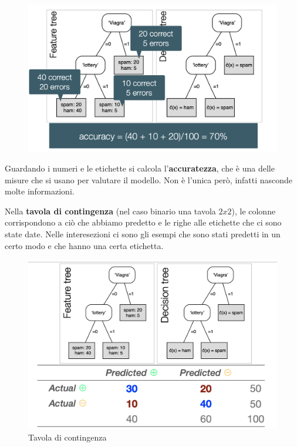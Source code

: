 \begin{figure}[!h]
    \centering
    \includegraphics[scale=0.6]{images/featureTree.png}
    \label{fig:enter-label}
\end{figure}
Guardando i numeri e le etichette si calcola l'\textbf{accuratezza}, che è una delle misure che si usano per valutare il modello. Non è l'unica però, infatti nasconde molte informazioni. 

Nella \textbf{tavola di contingenza} (nel caso binario una tavola $2x2$), le colonne corrispondono a ciò che abbiamo predetto e le righe alle etichette che ci sono state date. Nelle interesezioni ci sono gli esempi che sono stati predetti in un certo modo e che hanno una certa etichetta.
\begin{figure}[!h]
    \centering
    \includegraphics[scale=0.6]{images/contTable.png}
    \caption{Tavola di contingenza}
    \label{fig:enter-label}
\end{figure}

